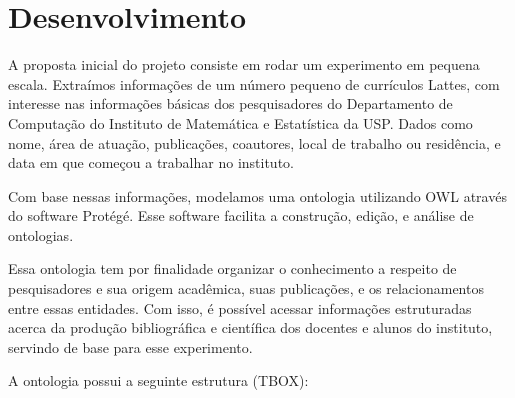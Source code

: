 \chapter{Desenvolvimento}
\label{cap:desenvolvimento}

A proposta inicial do projeto consiste em rodar um experimento em pequena escala. Extraímos informações de um número pequeno de currículos Lattes, com interesse nas informações básicas dos pesquisadores do Departamento de Computação do Instituto de Matemática e Estatística da USP. Dados como nome, área de atuação, publicações, coautores, local de trabalho ou residência, e data em que começou a trabalhar no instituto.

Com base nessas informações, modelamos uma ontologia utilizando OWL através do software Protégé. Esse software facilita a construção, edição, e análise de ontologias.

Essa ontologia tem por finalidade organizar o conhecimento a respeito de pesquisadores e sua origem acadêmica, suas publicações, e os relacionamentos entre essas entidades. Com isso, é possível acessar informações estruturadas acerca da produção bibliográfica e científica dos docentes e alunos do instituto, servindo de base para esse experimento.


A ontologia possui a seguinte estrutura (TBOX):


